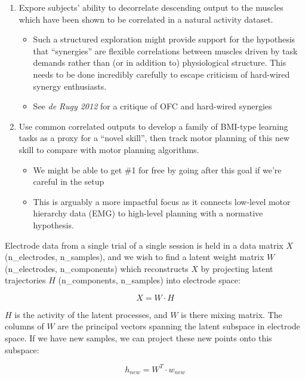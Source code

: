 \documentclass[
  a4paper,
]{article}
\providecommand{\tightlist}{%
  \setlength{\itemsep}{0pt}\setlength{\parskip}{0pt}}
\begin{document}
\begin{enumerate}
\def\labelenumi{\arabic{enumi}.}
\tightlist
\item
  Expore subjects' ability to decorrelate descending output to the
  muscles which have been shown to be correlated in a natural activity
  dataset.

  \begin{itemize}
  \tightlist
  \item
    Such a structured exploration might provide support for the
    hypothesis that ``synergies'' are flexible correlations between
    muscles driven by task demands rather than (or in addition to)
    physiological structure. This needs to be done incredibly carefully
    to escape criticism of hard-wired synergy enthusiasts.
  \item
    See \emph{de Rugy 2012} for a critique of OFC and hard-wired
    synergies
  \end{itemize}
\item
  Use common correlated outputs to develop a family of BMI-type learning
  tasks as a proxy for a ``novel skill'', then track motor planning of
  this new skill to compare with motor planning algorithms.

  \begin{itemize}
  \tightlist
  \item
    We might be able to get \#1 for free by going after this goal if
    we're careful in the setup
  \item
    This is arguably a more impactful focus as it connects low-level
    motor hierarchy data (EMG) to high-level planning with a normative
    hypothesis.
  \end{itemize}
\end{enumerate}

Electrode data from a single trial of a single session is held in a data
matrix \(X\) (n\_electrodes, n\_samples), and we wish to find a latent
weight matrix \(W\) (n\_electrodes, n\_components) which reconstructs
\(X\) by projecting latent trajectories \(H\) (n\_components,
n\_samples) into electrode space:

\[
X = W\cdot{H}
\]

\(H\) is the activity of the latent processes, and \(W\) is there mixing
matrix. The columns of \(W\) are the principal vectors spanning the
latent subspace in electrode space. If we have new samples, we can
project these new points onto this subspace:

\[
h_{new} = W^T\cdot{w_{new}}
\]
\end{document}
